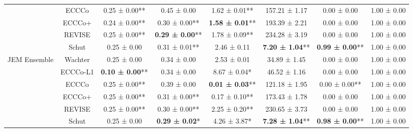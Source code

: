 \begin{table}
{\begin{tabular}[t]{cccccccc}
 & ECCCo & 0.25 ± 0.00** & 0.45 ± 0.00\hphantom{*}\hphantom{*} & 1.62 ± 0.01** & 157.21 ± 1.17\hphantom{*}\hphantom{*} & 0.00 ± 0.00\hphantom{*}\hphantom{*} & 1.00 ± 0.00\hphantom{*}\hphantom{*}\\

 & ECCCo+ & 0.24 ± 0.00** & 0.30 ± 0.00** & \textbf{1.58 ± 0.01}** & 193.39 ± 2.21\hphantom{*}\hphantom{*} & 0.00 ± 0.00\hphantom{*}\hphantom{*} & 1.00 ± 0.00\hphantom{*}\hphantom{*}\\

 & REVISE & 0.25 ± 0.00** & \textbf{0.29 ± 0.00}** & 1.78 ± 0.09** & 234.28 ± 3.19\hphantom{*}\hphantom{*} & 0.00 ± 0.00\hphantom{*}\hphantom{*} & 1.00 ± 0.00\hphantom{*}\hphantom{*}\\

 & Schut & 0.25 ± 0.00\hphantom{*}\hphantom{*} & 0.31 ± 0.01** & 2.46 ± 0.11\hphantom{*}\hphantom{*} & \textbf{7.20 ± 1.04}** & \textbf{0.99 ± 0.00}** & 1.00 ± 0.00\hphantom{*}\hphantom{*}\\

\multirow[t]{-6}{*}{\centering\arraybackslash JEM Ensemble} & Wachter & 0.25 ± 0.00\hphantom{*}\hphantom{*} & 0.34 ± 0.00\hphantom{*}\hphantom{*} & 2.53 ± 0.01\hphantom{*}\hphantom{*} & 34.89 ± 1.45\hphantom{*}\hphantom{*} & 0.00 ± 0.00\hphantom{*}\hphantom{*} & 1.00 ± 0.00\hphantom{*}\hphantom{*}\\
\cmidrule{1-8}
 & ECCCo-L1 & \textbf{0.10 ± 0.00}** & 0.34 ± 0.00\hphantom{*}\hphantom{*} & 8.67 ± 0.04*\hphantom{*} & 46.52 ± 1.16\hphantom{*}\hphantom{*} & 0.00 ± 0.00\hphantom{*}\hphantom{*} & 1.00 ± 0.00\hphantom{*}\hphantom{*}\\

 & ECCCo & 0.25 ± 0.00** & 0.39 ± 0.00\hphantom{*}\hphantom{*} & \textbf{0.01 ± 0.03}** & 121.18 ± 1.95\hphantom{*}\hphantom{*} & 0.00 ± 0.00** & 1.00 ± 0.00\hphantom{*}\hphantom{*}\\

 & ECCCo+ & 0.25 ± 0.00** & 0.31 ± 0.00** & 0.17 ± 0.10** & 173.43 ± 1.78\hphantom{*}\hphantom{*} & 0.00 ± 0.00\hphantom{*}\hphantom{*} & 1.00 ± 0.00\hphantom{*}\hphantom{*}\\

 & REVISE & 0.25 ± 0.00** & 0.30 ± 0.00** & 2.25 ± 0.20** & 230.65 ± 3.73\hphantom{*}\hphantom{*} & 0.00 ± 0.00\hphantom{*}\hphantom{*} & 1.00 ± 0.00\hphantom{*}\hphantom{*}\\

 & Schut & 0.25 ± 0.00\hphantom{*}\hphantom{*} & \textbf{0.29 ± 0.02}*\hphantom{*} & 4.26 ± 3.87*\hphantom{*} & \textbf{7.28 ± 1.04}** & \textbf{0.98 ± 0.00}** & 1.00 ± 0.00\hphantom{*}\hphantom{*}\\


\end{tabular}}
\end{table}
